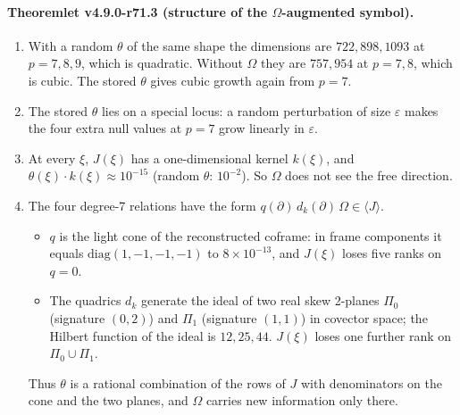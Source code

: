 \paragraph{Theoremlet v4.9.0-r71.3 (structure of the \(\Omega\)-augmented symbol).}
\begin{enumerate}[leftmargin=2em]
\item[(a)] With a random \(\theta\) of the same shape the dimensions are \(722, 898, 1093\) at \(p=7,8,9\), which is quadratic.
Without \(\Omega\) they are \(757, 954\) at \(p=7,8\), which is cubic.  The stored \(\theta\) gives cubic growth again from \(p=7\).
\item[(b)] The stored \(\theta\) lies on a special locus: a random perturbation of size \(\varepsilon\) makes the four extra null
values at \(p=7\) grow linearly in \(\varepsilon\).
\item[(c)] At every \(\xi\), \(J(\xi)\) has a one-dimensional kernel \(k(\xi)\), and \(\theta(\xi)\cdot k(\xi)\approx10^{-15}\)
(random \(\theta\): \(10^{-2}\)).  So \(\Omega\) does not see the free direction.
\item[(d)] The four degree-7 relations have the form \(q(\partial)\,d_k(\partial)\,\Omega\in\langle J\rangle\).
\begin{itemize}
\item \(q\) is the light cone of the reconstructed coframe: in frame components it equals \(\mathrm{diag}(1,-1,-1,-1)\) to
\(8\times10^{-13}\), and \(J(\xi)\) loses five ranks on \(q=0\).
\item The quadrics \(d_k\) generate the ideal of two real skew 2-planes \(\Pi_0\) (signature \((0,2)\)) and \(\Pi_1\)
(signature \((1,1)\)) in covector space; the Hilbert function of the ideal is \(12,25,44\).  \(J(\xi)\) loses one further
rank on \(\Pi_0\cup\Pi_1\).
\end{itemize}
Thus \(\theta\) is a rational combination of the rows of \(J\) with denominators on the cone and the two planes, and \(\Omega\)
carries new information only there.
\end{enumerate}

